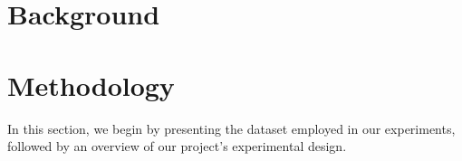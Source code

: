 \documentclass[conference]{IEEEtran}
\begin{document}
%



\section{Background}

\section{Methodology}
In this section, we begin by presenting the dataset employed in our experiments, followed by an overview of our project's experimental design.
\end{document}
